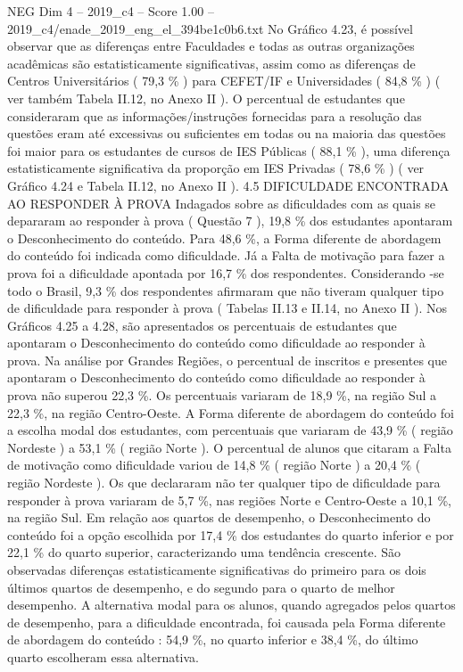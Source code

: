 \begin{textsample}{NEG Dim 4 – 2019\_c4 – Score 1.00 – 2019\_c4/enade\_2019\_eng\_el\_394be1c0b6.txt}
No Gráfico 4.23, é possível observar que as diferenças entre Faculdades e todas as outras organizações acadêmicas são estatisticamente significativas, assim como as diferenças de Centros Universitários ( 79,3 \% ) para CEFET/IF e Universidades ( 84,8 \% ) ( ver também Tabela II.12, no Anexo II ).
O percentual de estudantes que consideraram que as informações/instruções fornecidas para a resolução das questões eram até excessivas ou suficientes em todas ou na maioria das questões foi maior para os estudantes de cursos de IES Públicas ( 88,1 \% ), uma diferença estatisticamente significativa da proporção em IES Privadas ( 78,6 \% ) ( ver Gráfico 4.24 e Tabela II.12, no Anexo II ). 4.5 DIFICULDADE ENCONTRADA AO RESPONDER À PROVA Indagados sobre as dificuldades com as quais se depararam ao responder à prova ( Questão 7 ), 19,8 \% dos estudantes apontaram o Desconhecimento do conteúdo.
Para 48,6 \%, a Forma diferente de abordagem do conteúdo foi indicada como dificuldade.
Já a Falta de motivação para fazer a prova foi a dificuldade apontada por 16,7 \% dos respondentes.
Considerando -se todo o Brasil, 9,3 \% dos respondentes afirmaram que não tiveram qualquer tipo de dificuldade para responder à prova ( Tabelas II.13 e II.14, no Anexo II ).
Nos Gráficos 4.25 a 4.28, são apresentados os percentuais de estudantes que apontaram o Desconhecimento do conteúdo como dificuldade ao responder à prova.
Na análise por Grandes Regiões, o percentual de inscritos e presentes que apontaram o Desconhecimento do conteúdo como dificuldade ao responder à prova não superou 22,3 \%.
Os percentuais variaram de 18,9 \%, na região Sul a 22,3 \%, na região Centro-Oeste.
A Forma diferente de abordagem do conteúdo foi a escolha modal dos estudantes, com percentuais que variaram de 43,9 \% ( região Nordeste ) a 53,1 \% ( região Norte ).
O percentual de alunos que citaram a Falta de motivação como dificuldade variou de 14,8 \% ( região Norte ) a 20,4 \% ( região Nordeste ).
Os que declararam não ter qualquer tipo de dificuldade para responder à prova variaram de 5,7 \%, nas regiões Norte e Centro-Oeste a 10,1 \%, na região Sul.
Em relação aos quartos de desempenho, o Desconhecimento do conteúdo foi a opção escolhida por 17,4 \% dos estudantes do quarto inferior e por 22,1 \% do quarto superior, caracterizando uma tendência crescente.
São observadas diferenças estatisticamente significativas do primeiro para os dois últimos quartos de desempenho, e do segundo para o quarto de melhor desempenho.
A alternativa modal para os alunos, quando agregados pelos quartos de desempenho, para a dificuldade encontrada, foi causada pela Forma diferente de abordagem do conteúdo : 54,9 \%, no quarto inferior e 38,4 \%, do último quarto escolheram essa alternativa.

\end{textsample}
